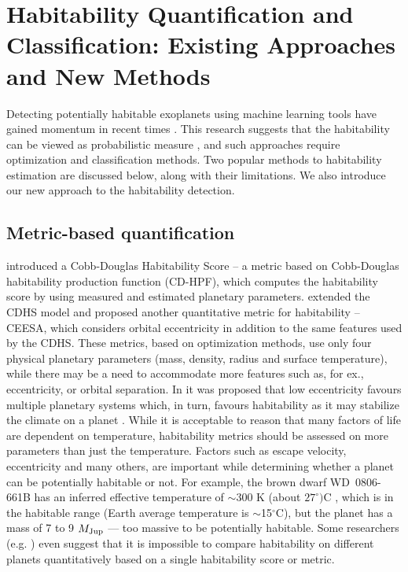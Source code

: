 \documentclass[fleqn,usenatbib]{mnras}
\begin{document}
\section{Habitability Quantification and Classification: Existing Approaches and New Methods}\label{sec:RelatedWork}

Detecting potentially habitable exoplanets using machine learning tools have gained momentum in recent times \citep{old,new,ceesa}. This research suggests that the habitability can be viewed as probabilistic measure \citep{old}, and such approaches require optimization and classification methods. Two popular methods to habitability estimation are discussed below, along with their limitations. We also introduce our new approach to the habitability detection.

\subsection{Metric-based quantification}

\citet{old} introduced a Cobb-Douglas Habitability Score -- a metric based on Cobb-Douglas habitability production function (CD-HPF), which computes the habitability score by using measured and estimated planetary parameters. \citet{ceesa} extended the CDHS model and proposed another quantitative metric for habitability -- CEESA, which considers orbital eccentricity in addition to the same features used by the CDHS. These metrics, based on optimization methods, use only four physical planetary parameters (mass, density, radius and surface temperature), while there may be a need to accommodate more features such as, for ex., eccentricity, or orbital separation. In \citet{limbach} it was proposed that low eccentricity favours multiple planetary systems which, in turn, favours habitability as it may stabilize the climate on a planet \citep{wang}. While it is acceptable to reason that many factors of life are dependent on temperature, habitability metrics should be assessed on more parameters than just the temperature. Factors such as escape velocity, eccentricity and many others, are important while determining whether a planet can be potentially habitable or not. For example, the brown dwarf WD~0806-661B has an inferred effective temperature of $\sim$300 K (about $27^{\circ})$C \citep{Luhman}, which is in the habitable range (Earth average temperature is $\sim$15$^{\circ}$C), but the planet has a mass of 7 to 9 $M_{\rm Jup}$ --- too massive to be potentially habitable. Some researchers (e.g. \citet{tasker}) even suggest that it is impossible to compare habitability on different planets quantitatively based on a single habitability score or metric.
\end{document}
